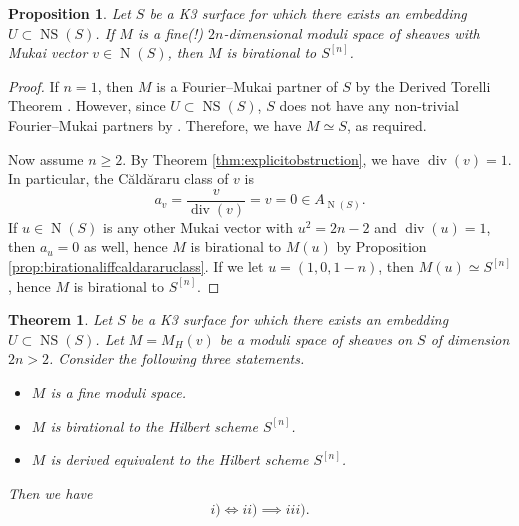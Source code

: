 \documentclass[11pt,twoside]{amsart}
\numberwithin{equation}{section}
\newtheorem{theorem}[dummy]{Theorem}
\newtheorem{proposition}[dummy]{Proposition}
\theoremstyle{definition}
\theoremstyle{plain}
\newcommand{\Z}{\ensuremath{\mathbb{Z}}}
\def\NS{\operatorname{NS}}
\def\N{\operatorname{N}}
\def\dv{\operatorname{div}}
\begin{document}
\begin{proposition}\label{prop:finemodulispacebirationaltohilbertscheme}
    Let $S$ be a K3 surface for which there exists an embedding $U\subset \NS(S)$. If $M$ is a fine(!) $2n$-dimensional moduli space of sheaves with Mukai vector $v\in \N(S)$, then $M$ is birational to $S^{[n]}$. 
\end{proposition}
\begin{proof}
    If $n=1$, then $M$ is a Fourier--Mukai partner of $S$ by the Derived Torelli Theorem \cite{Muk87,Orl03}. However, since $U\subset \NS(S)$, $S$ does not have any non-trivial Fourier--Mukai partners by \cite[Corollary 2.7(3)]{HLOY02}. Therefore, we have $M\simeq S$, as required.

    Now assume $n\geq 2$.
    By Theorem \ref{thm:explicitobstruction}, we have $\dv(v) = 1$. In particular, the C\u ald\u araru class of $v$ is $$a_v = \frac{v}{\dv(v)} = v = 0\in A_{\N(S)}.$$ If $u\in \N(S)$ is any other Mukai vector with $u^2 = 2n-2$ and  $\dv(u) = 1$, then $a_u = 0$ as well, hence $M$ is birational to $M(u)$ by Proposition \ref{prop:birationaliffcaldararuclass}. If we let $u = (1,0,1-n)$, then $M(u)\simeq S^{[n]}$, hence $M$ is birational to $S^{[n]}$.
\end{proof}


\begin{theorem}\label{thm:noderivedtorelli}
    Let $S$ be a K3 surface for which there exists an embedding $U\subset \NS(S)$. Let $M = M_H(v)$ be a moduli space of sheaves on $S$ of dimension $2n>2$. Consider the following three statements. 
    \begin{itemize}
        \item[i)] $M$ is a fine moduli space.
        \item[ii)] $M$ is birational to the Hilbert scheme $S^{[n]}$.
        \item[iii)] $M$ is derived equivalent to the Hilbert scheme $S^{[n]}$.
    \end{itemize}
    Then we have $$i) \iff ii) \implies iii).$$ 
\end{theorem}




\end{document}
